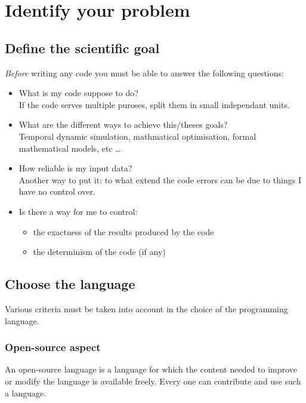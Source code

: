 \documentclass[11pt]{article}
\begin{document}
	\section{Identify your problem}
		\label{sec:cerner}

		\subsection{Define the scientific goal}
			\emph{Before} writing any code you must be able to answer the following questions:
			\begin{itemize}
				\item What is my code suppose to do? \\
				If the code serves multiple puroses, split them in small independant units.
				\item What are the different ways to achieve this/theses goals? \\
				Temporal dynamic simulation, mathmatical optimisation, formal mathematical models, etc \ldots

				\item How reliable is my input data? \\
				Another way to put it: to what extend the code errors can be due to things I have no control over.
				\item Is there a way for me to control:
				\begin{itemize}
					\item the exactness of the results produced by the code
					\item the determinism of the code (if any)
				\end{itemize}
			\end{itemize}

		\subsection{Choose the language}
			Various criteria must be taken into account in the choice of the programming language.

			\subsubsection{Open-source aspect}
				An open-source language is a language for which the content needed to improve or modify the language is available freely. Every one can contribute and use such a language.
\end{document}
